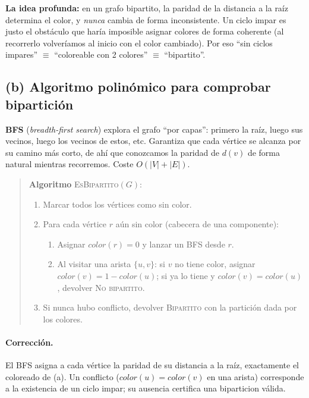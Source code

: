 \documentclass[11pt,a4paper]{article}
\theoremstyle{plain}
\theoremstyle{definition}
\begin{document}
\begin{porque}
\textbf{La idea profunda:} en un grafo bipartito, la paridad de la distancia a la
ra\'iz determina el color, y \emph{nunca} cambia de forma inconsistente. Un ciclo
impar es justo el obst\'aculo que har\'ia imposible asignar colores de forma
coherente (al recorrerlo volver\'iamos al inicio con el color cambiado). Por eso
``sin ciclos impares'' $\equiv$ ``coloreable con 2 colores'' $\equiv$ ``bipartito''.
\end{porque}

\subsection*{(b) Algoritmo polin\'omico para comprobar bipartici\'on}

\begin{concepto}
\textbf{BFS} (\emph{breadth-first search}) explora el grafo ``por capas'': primero la
ra\'iz, luego sus vecinos, luego los vecinos de estos, etc. Garantiza que cada
v\'ertice se alcanza por su camino m\'as corto, de ah\'i que conozcamos la paridad de
$d(v)$ de forma natural mientras recorremos. Coste $O(|V|+|E|)$.
\end{concepto}

\begin{quote}
\textbf{Algoritmo} \textsc{EsBipartito}$(G)$:
\begin{enumerate}[nosep]
  \item Marcar todos los v\'ertices como sin color.
  \item Para cada v\'ertice $r$ a\'un sin color (cabecera de una componente):
        \begin{enumerate}[nosep]
          \item Asignar $color(r)=0$ y lanzar un BFS desde $r$.
          \item Al visitar una arista $\{u,v\}$: si $v$ no tiene color, asignar
                $color(v)=1-color(u)$; si ya lo tiene y $color(v)=color(u)$,
                devolver \textsc{No bipartito}.
        \end{enumerate}
  \item Si nunca hubo conflicto, devolver \textsc{Bipartito} con la partici\'on dada
        por los colores.
\end{enumerate}
\end{quote}

\paragraph{Correcci\'on.} El BFS asigna a cada v\'ertice la paridad de su distancia a
la ra\'iz, exactamente el coloreado de (a). Un conflicto ($color(u)=color(v)$ en una
arista) corresponde a la existencia de un ciclo impar; su ausencia certifica una
biparticion v\'alida.
\end{document}
